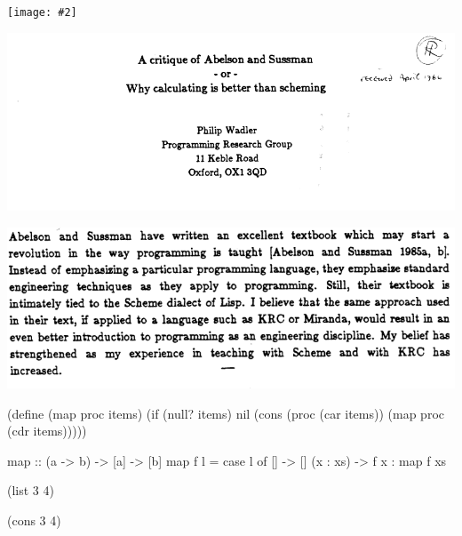 \documentclass[UKenglish,usenames,dvipsnames,svgnames,table,aspectratio=169,mathserif]{beamer}
\newcommand{\nl}{\vspace{\baselineskip}}
\newcommand{\imageslide}[2][1]{{
\begin{frame}\begin{center}
\texttt{[image: \#2]}
\end{center}\end{frame}
}}
\begin{document}
\imageslide[0.5]{htdp-cover.png}

\begin{frame}
\centering
\includegraphics[scale=0.5]{wadler-title.png}
\end{frame}


\begin{frame}
\centering
\includegraphics[scale=0.55]{wadler-abstract.png}
\end{frame}


\begin{frame}[fragile]
\begin{schemecode}
(define (map proc items)
  (if (null? items)
      nil
      (cons (proc (car items))
            (map proc (cdr items)))))
\end{schemecode}
\nl

\begin{haskellcode}
map :: (a -> b) -> [a] -> [b]
map f l =
  case l of
    []       -> []
    (x : xs) -> f x : map f xs
\end{haskellcode}
\end{frame}


\begin{frame}[fragile]
\LARGE
\begin{schemecode}
             (list 3 4)

             (cons 3 4)
\end{schemecode}
\end{frame}
\end{document}
